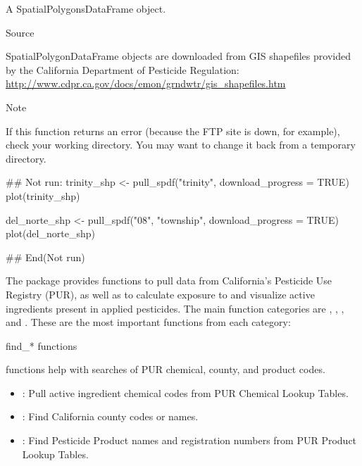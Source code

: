 \documentclass[a4paper]{book}
\begin{document}
%
\begin{Value}
A SpatialPolygonsDataFrame object.
\end{Value}
%
\begin{Section}{Source}

SpatialPolygonDataFrame objects are downloaded from GIS shapefiles provided
by the California Department of Pesticide Regulation:
\url{http://www.cdpr.ca.gov/docs/emon/grndwtr/gis_shapefiles.htm}
\end{Section}
%
\begin{Section}{Note}

If this function returns an error (because the FTP site is down, for
example), check your working directory. You may want to change it back from
a temporary directory.
\end{Section}
%
\begin{Examples}
\begin{ExampleCode}
## Not run:
trinity_shp <- pull_spdf("trinity", download_progress = TRUE)
plot(trinity_shp)

del_norte_shp <- pull_spdf("08", "township", download_progress = TRUE)
plot(del_norte_shp)

## End(Not run)
\end{ExampleCode}
\end{Examples}
%
\begin{Description}\relax
The  package provides functions to pull data from California's
Pesticide Use Registry (PUR), as well as to calculate exposure to and
visualize active ingredients present in applied pesticides. The main function
categories are , , , and
. These are the most important functions from each category:
\end{Description}
%
\begin{Section}{find\_* functions}

 functions help with searches of PUR chemical, county, and
product codes.
\begin{itemize}

\item {}: Pull active ingredient chemical codes
from PUR Chemical Lookup Tables.
\item {}: Find California county codes or names.
\item {}: Find Pesticide Product names and registration
numbers from PUR Product Lookup Tables.

\end{itemize}

\end{Section}
\end{document}
